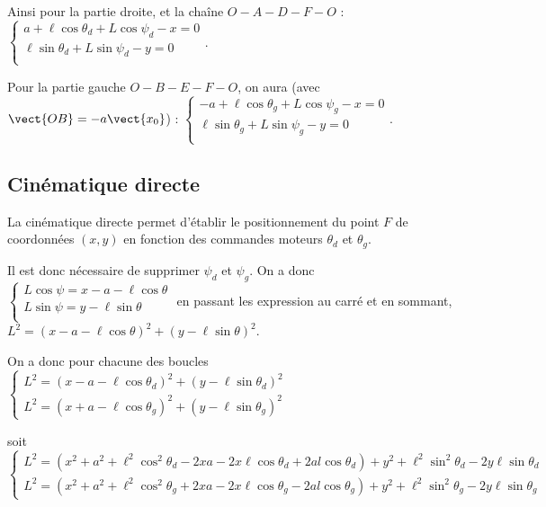 \documentclass[10pt,fleqn]{article} %
\begin{document}
Ainsi pour la partie droite, et la chaîne $O - A - D - F - O$ :
$
\left\{
\begin{array}{l}
a+ \ell  \cos\theta_d +L \cos\psi_d   -x  = 0 \\
\ell   \sin\theta_d +L\sin\psi_d  -y = 0 \\
\end{array}
\right.
$.

Pour la partie gauche $O - B- E- F - O$, on aura (avec $\vect{OB}=-a\vect{x_0}$) : 
$
\left\{
\begin{array}{l}
-a+ \ell  \cos\theta_g +L \cos\psi_g   -x  = 0 \\
\ell   \sin\theta_g +L\sin\psi_g  -y = 0 \\
\end{array}
\right.
$.

\subsection{Cinématique directe}
La cinématique directe permet d'établir le positionnement du point $F$ de coordonnées $(x,y)$ en fonction des commandes moteurs $\theta_d$ et $\theta_g$. 

Il est donc nécessaire de supprimer $\psi_d$ et $\psi_g$. On a donc
$
\left\{
\begin{array}{l}
L \cos\psi   = x  -a- \ell  \cos\theta  \\
L\sin\psi = y - \ell   \sin\theta \\
\end{array}
\right.
$ 
en passant les expression au carré et en sommant, 
 $L^2 = \left(x  -a- \ell  \cos\theta \right)^2 + \left( y - \ell   \sin\theta \right)^2$.

On a donc pour chacune des boucles 
$
\left\{
\begin{array}{l}
L^2 = \left(x  -a- \ell  \cos\theta_d \right)^2 + \left( y - \ell   \sin\theta_d \right)^2 \\
L^2 = \left(x  +a- \ell  \cos\theta_g \right)^2 + \left( y - \ell   \sin\theta_g \right)^2
\end{array}
\right.
$ 

soit 
$
\left\{
\begin{array}{l}
L^2 = \left(x^2  +a^2+\ell^2  \cos^2\theta_d  -2xa -2x\ell\cos\theta_d+2al\cos\theta_d  \right) +  y^2 + \ell^2   \sin^2\theta_d- 2y \ell   \sin\theta_d  \\
L^2 = \left(x^2  +a^2+\ell^2  \cos^2\theta_g  +2xa -2x\ell\cos\theta_g-2al\cos\theta_g \right) +  y^2 + \ell^2   \sin^2\theta_g -2y  \ell   \sin\theta_g 
\end{array}
\right.
$ 
\end{document}
